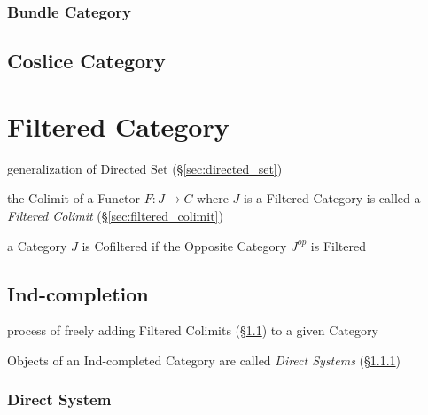 \subsubsection{Bundle Category}\label{sec:bundle_category}



\subsection{Coslice Category}\label{sec:coslice_category}



\section{Filtered Category}\label{sec:filtered_category}

generalization of Directed Set (\S\ref{sec:directed_set})

the Colimit of a Functor $F : J \to C$ where $J$ is a Filtered Category is
called a \emph{Filtered Colimit} (\S\ref{sec:filtered_colimit})

a Category $J$ is Cofiltered if the Opposite Category $J^{op}$ is Filtered



\subsection{Ind-completion}\label{sec:ind_completion}

process of freely adding Filtered Colimits (\S\ref{sec:ind_completion}) to a
given Category

Objects of an Ind-completed Category are called \emph{Direct Systems}
(\S\ref{sec:direct_system})



\subsubsection{Direct System}\label{sec:direct_system}

